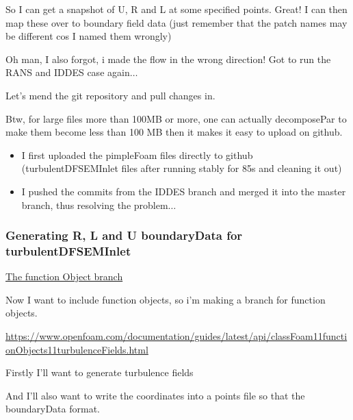 \documentclass[12pt]{article}
\renewcommand{\_}{\kern-1.5pt\textunderscore\kern-1.5pt}
\begin{document}
So I can get a snapshot of U, R and L at some specified points. Great! I can then map these over to boundary field data (just remember that the patch names may be different cos I named them wrongly)\par

Oh man, I also forgot, i made the flow in the wrong direction! Got to run the RANS and IDDES case again$ \ldots $ \par

Let’s mend the git repository and pull changes in.\par


\vspace{\baselineskip}
Btw, for large files more than 100MB or more, one can actually decomposePar to make them become less than 100 MB then it makes it easy to upload on github.\par
\begin{itemize}
	\item I first uploaded the pimpleFoam files directly to github (turbulentDFSEMInlet files after running stably for 85s and cleaning it out)\par

	\item I pushed the commits from the IDDES branch and merged it into the master branch, thus resolving the problem$ \ldots $ 
\end{itemize}

\par

\subsubsection{Generating R, L and U boundaryData for turbulentDFSEMInlet}

\uline{The function Object branch}\par

Now I want to include function objects, so i’m making a branch for function objects.\par

\href{https://www.openfoam.com/documentation/guides/latest/api/classFoam_1_1functionObjects_1_1turbulenceFields.html}{https://www.openfoam.com/documentation/guides/latest/api/classFoam\_1\_1functionObjects\_1\_1turbulenceFields.html}\par

Firstly I’ll want to generate turbulence fields\par

And I’ll also want to write the coordinates into a points file so that the boundaryData format.\par
\end{document}
